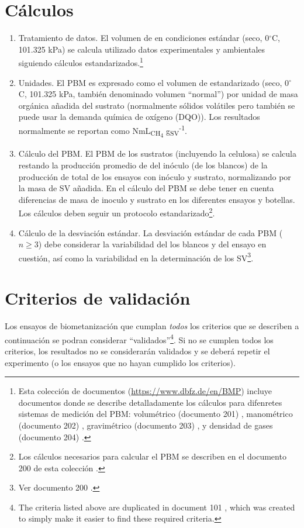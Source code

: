 \documentclass[]{article}
\begin{document}
\section{Cálculos}
\label{sec:calculations}
\begin{enumerate}
  \item Tratamiento de datos.
    El volumen de  en condiciones estándar (seco, 0$^\circ$C, 101.325 kPa) se calcula utilizado datos experimentales y ambientales siguiendo cálculos estandarizados.\footnote{
      Esta colección de documentos (\url{https://www.dbfz.de/en/BMP}) incluye documentos donde se describe detalladamente los cálculos para difenretes sistemas de medición del PBM: volumétrico (documento 201) \citep{BMPdoc201vol}, manométrico (documento 202) \citep{BMPdoc202man}, gravimétrico (documento 203) \citep{BMPdoc203grav}, y densidad de gases (documento 204) \citep{BMPdoc204gasdens}.
    }
  \item Unidades.
	  El PBM es expresado como el volumen de  estandarizado (seco, 0$^\circ$C, 101.325 kPa, también denominado volumen ``normal'') por unidad de masa orgánica añadida del sustrato (normalmente sólidos volátiles pero también se puede usar la demanda química de oxígeno (DQO)). Los resultados normalmente se reportan como NmL\textsubscript{CH\textsubscript{4}} g\textsubscript{SV}\textsuperscript{-1}. 
  \item Cálculo del PBM.
    El PBM de los sustratos (incluyendo la celulosa) se calcula restando la producción promedio de  del inóculo (de los blancos) de la producción de  total de los ensayos con inóculo y sustrato, normalizando por la masa de SV añadida. En el cálculo del PBM se debe tener en cuenta diferencias de masa de inoculo y sustrato en los diferentes ensayos y botellas.
    Los cálculos deben seguir un protocolo estandarizado\footnote{
      Los cálculos necesarios para calcular el PBM se describen en el documento  200 de esta colección \citep{BMPdoc200BMP}.
    }.
  \item Cálculo de la desviación estándar.
    La desviación estándar de cada PBM ($n \ge 3$) debe considerar la variabilidad del los blancos y del ensayo en cuestión, así como la variabilidad en la determinación de los SV\footnote{
      Ver documento 200 \citep{BMPdoc200BMP}. 
    }.
\end{enumerate}

\section{Criterios de validación}
\label{sec:crit}
Los ensayos de biometanización que cumplan \textit{todos} los criterios que se describen a continuación se podran considerar ``validados''\footnote{
The criteria listed above are duplicated in document 101 \citep{BMPdoc101val}, which was created to simply make it easier to find these required criteria.
}.
Si no se cumplen todos los criterios, los resultados no se considerarán validados y se deberá repetir el experimento (o los ensayos que no hayan cumplido los criterios).
\end{document}
